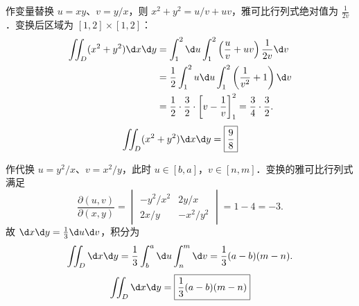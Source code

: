 \begin{solution}
    作变量替换 $u = xy$、$v = y/x$，则 $x^2+y^2 = u/v + uv$，雅可比行列式绝对值为 $\frac{1}{2v}$．变换后区域为 $[1, 2] \times [1, 2]$：
    \begin{equation}
        \begin{aligned}
            \iint_D (x^2+y^2) \d x \d y & = \int_1^2 \d u \int_1^2 \left( \frac{u}{v} + uv \right) \frac{1}{2v} \d v                                \\
                                        & = \frac{1}{2} \int_1^2 u \d u \int_1^2 \left( \frac{1}{v^2} + 1 \right) \d v \label{eq:int-3-step}        \\
                                        & = \frac{1}{2} \cdot \frac{3}{2} \cdot \left[ v - \frac{1}{v} \right]_1^2 = \frac{3}{4} \cdot \frac{3}{2}.
        \end{aligned}
    \end{equation}
    \begin{equation}
        \iint_D (x^2+y^2) \d x \d y = \boxed{\frac{9}{8}}
    \end{equation}


    作代换 $u = y^2/x$、$v = x^2/y$，此时 $u \in [b, a]$，$v \in [n, m]$．变换的雅可比行列式满足
    \begin{equation}
        \frac{\partial(u,v)}{\partial(x,y)} = \begin{vmatrix} -y^2/x^2 & 2y/x \\ 2x/y & -x^2/y^2 \end{vmatrix} = 1 - 4 = -3.
    \end{equation}
    故 $\d x \d y = \frac{1}{3} \d u \d v$，积分为
    \begin{equation}
        \iint_D \d x \d y = \frac{1}{3} \int_b^a \d u \int_n^m \d v = \frac{1}{3}(a-b)(m-n).
    \end{equation}
    \begin{equation}
        \iint_D \d x \d y = \boxed{\frac{1}{3}(a-b)(m-n)}
    \end{equation}



\end{solution}
